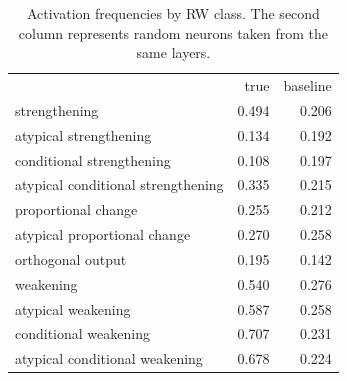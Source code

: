 \begin{table}
\caption{
                Activation frequencies by RW class.
                The second column represents random neurons taken from the same layers.
                }
\label{tab:summary}
\begin{tabular}{lrr}
 & true & baseline \\
strengthening & 0.494 & 0.206 \\
atypical strengthening & 0.134 & 0.192 \\
conditional strengthening & 0.108 & 0.197 \\
atypical conditional strengthening & 0.335 & 0.215 \\
proportional change & 0.255 & 0.212 \\
atypical proportional change & 0.270 & 0.258 \\
orthogonal output & 0.195 & 0.142 \\
weakening & 0.540 & 0.276 \\
atypical weakening & 0.587 & 0.258 \\
conditional weakening & 0.707 & 0.231 \\
atypical conditional weakening & 0.678 & 0.224 \\
\end{tabular}
\end{table}
